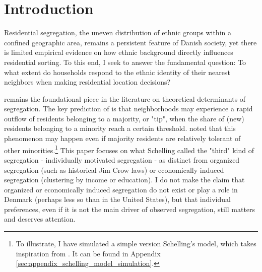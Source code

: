 \documentclass[../main.tex]{subfiles}
\begin{document}
\section{Introduction}

Residential segregation, the uneven distribution of ethnic groups within a confined geographic area, remains a persistent feature of Danish society, yet there is limited empirical evidence on how ethnic background directly influences residential sorting. To this end, I seek to answer the fundamental question: To what extent do households respond to the ethnic identity of their nearest neighbors when making residential location decisions?


\textcite{schelling1971dynamic} remains the foundational piece in the literature on theoretical determinants of segregation. The key prediction of \textcite{schelling1971dynamic} is that neighborhoods may experience a rapid outflow of residents belonging to a majority, or "tip", when the share of (new) residents belonging to a minority reach a certain threshold. \textcite{schelling1971dynamic} noted that this phenomenon may happen even if majority residents are relatively tolerant of other minorities.\footnote{To illustrate, I have simulated a simple version Schelling's model, which takes inspiration from \textcite{luca_mingarelli}. It can be found in Appendix \ref{sec:appendix_schelling_model_simulation}.} This paper focuses on what Schelling called the "third" kind of segregation - individually motivated segregation - as distinct from organized segregation (such as historical Jim Crow laws) or economically induced segregation (clustering by income or education).  I do not make the claim that organized or economically induced segregation do not exist or play a role in Denmark (perhaps less so than in the United States), but that individual preferences, even if it is not the main driver of observed segregation, still matters and deserves attention. 
\end{document}
